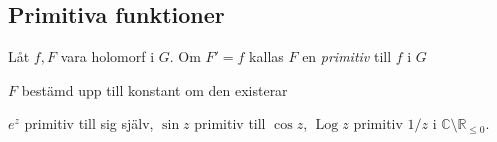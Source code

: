 \subsection{Primitiva funktioner}
\begin{definition}
Låt $f, F$ vara holomorf i $G$. Om $F' = f$ kallas $F$ en \emph{primitiv} till $f$ i $G$
\end{definition}

\begin{note}
$F$ bestämd upp till konstant om den existerar
\end{note}

\begin{example}
$e^z$ primitiv till sig själv, $\sin z$ primitiv till $\cos z$, $\operatorname{Log} z$ primitiv $1/z$ i $\mathbb{C} \setminus \mathbb{R}_{\le 0}$.
\end{example}
